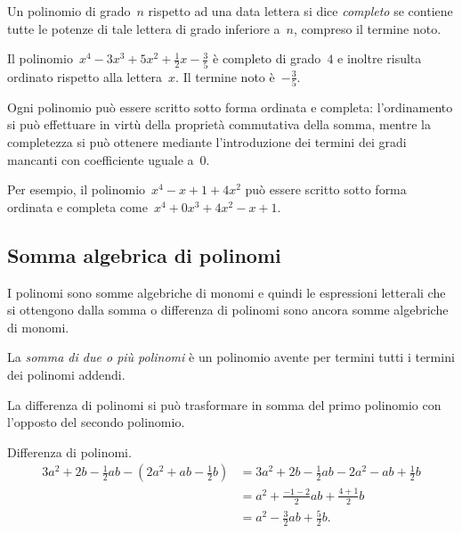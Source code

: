 \begin{definizione}
Un polinomio di grado~$n$ rispetto ad una data lettera si dice 
\emph{completo} se contiene tutte le potenze di tale lettera di grado 
inferiore a~$n$, compreso il termine noto.
\end{definizione}
\begin{exrig}
\begin{esempio}
Il polinomio~$x^4-3x^3+5x^2+\frac{1}{2}x-\frac{3}{5}$ è completo di 
grado~$4$ e inoltre risulta ordinato rispetto alla lettera~$x$. Il termine 
noto è~$-\frac{3}{5}$.
\end{esempio}
\end{exrig}

\osservazione
Ogni polinomio può essere scritto sotto forma ordinata e completa: 
l'ordinamento si può effettuare in virtù della proprietà commutativa della 
somma, mentre
la completezza si può ottenere mediante l'introduzione dei termini dei 
gradi mancanti con coefficiente uguale a~$0$.

Per esempio, il polinomio~$x^4-x+1+4x^2$ può essere scritto sotto forma 
ordinata e completa come~$x^4+0x^3+4x^2-x+1$.


\subsection{Somma algebrica di polinomi}
\label{subsec:10_poli_somma}

I polinomi sono somme algebriche di monomi e quindi le espressioni 
letterali che si ottengono dalla somma
o differenza di polinomi sono ancora somme algebriche di monomi.

\begin{definizione}
La \emph{somma di due o più polinomi} è un polinomio avente per termini 
tutti i termini dei polinomi addendi.
\end{definizione}

La differenza di polinomi si può trasformare in somma del primo polinomio 
con l'opposto del secondo polinomio.

\begin{exrig}
\begin{esempio}
Differenza di polinomi.
\begin{equation*}
\begin{split}
3a^2+2b-\frac{1}{2}ab-\left(2a^2+ab-\frac{1}{2}b\right)&=3a^2+2b-\frac{1}{2}
ab-2a^2-ab+\frac{1}{2}b\\
&=a^2+\frac{-1-2}{2}ab+\frac{4+1}{2}b\\
&=a^2-\frac{3}{2}ab+\frac{5}{2}b.
\end{split}
\end{equation*}
\end{esempio}
\end{exrig}

